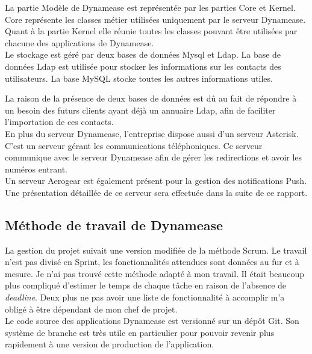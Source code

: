 La partie Modèle de Dynamease est représentée par les parties Core et Kernel. Core représente les classes métier utilisées uniquement par le serveur Dynamease. Quant à la partie Kernel elle réunie toutes les classes pouvant être utilisées par chacune des applications de Dynamease.\\

Le stockage est géré par deux bases de données Mysql et Ldap. La base de données Ldap est utilisée pour stocker les informations sur les contacts des utilisateurs. La base MySQL stocke toutes les autres informations utiles.

La raison de la présence de deux bases de données est dû au fait de répondre à un besoin des futurs clients ayant déjà un annuaire Ldap, afin de faciliter l'importation de ces contacts.\\

En plus du serveur Dynamease, l'entreprise dispose aussi d'un serveur Asterisk. C'est un serveur gérant les communications téléphoniques. Ce serveur communique avec le serveur Dynamease afin de gérer les redirections et avoir les numéros entrant.\\

Un serveur Aerogear est également présent pour la gestion des notifications Push. Une présentation détaillée de ce serveur sera effectuée dans la suite de ce rapport.

\subsection{Méthode de travail de Dynamease}

La gestion du projet suivait une version modifiée de la méthode Scrum. Le travail n'est pas divisé en Sprint, les fonctionnalités attendues sont données au fur et à mesure. Je n'ai pas trouvé cette méthode adapté à mon travail. Il était beaucoup plus compliqué d'estimer le temps de chaque tâche en raison de l'absence de \textit{deadline}. Deux plus ne pas avoir une liste de fonctionnalité à accomplir m'a obligé à être dépendant de mon chef de projet.\\

Le code source des applications Dynamease est versionné sur un dépôt Git. Son système de branche est très utile en particulier pour pouvoir revenir plus rapidement à une version de production de l'application.
